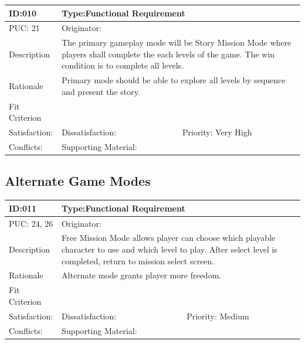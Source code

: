 \documentclass{article}
\begin{document}
\begin{table}[H]
\begin{tabular}{|l|l|l|}
\hline
ID:010 & \multicolumn{2}{l|}{Type:Functional Requirement} \\ \hline
PUC: 21 & \multicolumn{2}{l|}{Originator:} \\ \hline
Description & \multicolumn{2}{m{0.85\textwidth}|}{The primary gameplay mode will be Story Mission Mode where players shall complete the each levels of the game. The win condition is to complete all levels.} \\ \hline
Rationale & \multicolumn{2}{m{0.85\textwidth}|}{Primary mode should be able to explore all levels by sequence and present the story.} \\ \hline
Fit Criterion & \multicolumn{2}{m{0.85\textwidth}|}{} \\ \hline
Satisfaction: & Dissatisfaction: & Priority: Very High\\ \hline
Conflicts: & \multicolumn{2}{l|}{Supporting Material:} \\ \hline
\end{tabular}
\end{table}

\subsection{Alternate Game Modes}


\begin{table}[H]
\begin{tabular}{|l|l|l|}
\hline
ID:011 & \multicolumn{2}{l|}{Type:Functional Requirement} \\ \hline
PUC: 24, 26 & \multicolumn{2}{l|}{Originator:} \\ \hline
Description & \multicolumn{2}{m{0.85\textwidth}|}{Free Mission Mode allows player can choose which playable character to use and which level to play. After select level is completed, return to mission select screen.} \\ \hline
Rationale & \multicolumn{2}{m{0.85\textwidth}|}{Alternate mode grants player more freedom. } \\ \hline
Fit Criterion & \multicolumn{2}{m{0.85\textwidth}|}{} \\ \hline
Satisfaction: & Dissatisfaction: & Priority: Medium\\ \hline
Conflicts: & \multicolumn{2}{l|}{Supporting Material:} \\ \hline
\end{tabular}
\end{table}
\end{document}
